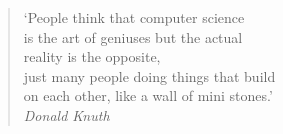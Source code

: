 
\clearpage

\narrowlinespacing

\vspace*{\fill}

\begin{quote} 
\centering 

`People think that computer science\\
is the art of geniuses but the actual\\
reality is the opposite,\\
just many people doing things that build\\
on each other, like a wall of mini stones.'\\

\emph{Donald Knuth}

\end{quote}

\vspace*{\fill}
%

\normallinespacing
